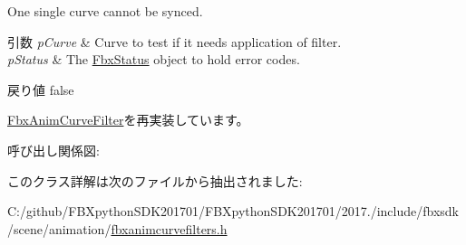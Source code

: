 One single curve cannot be sync\textquotesingle{}ed. 
\begin{DoxyParams}{引数}
{\em p\+Curve} & Curve to test if it needs application of filter. \\
\hline
{\em p\+Status} & The \hyperlink{class_fbx_status}{Fbx\+Status} object to hold error codes. \\
\hline
\end{DoxyParams}
\begin{DoxyReturn}{戻り値}
{\ttfamily false} 
\end{DoxyReturn}


\hyperlink{class_fbx_anim_curve_filter_af768a9c47e4f5a5fff47a8ec781e6b4c}{Fbx\+Anim\+Curve\+Filter}を再実装しています。

呼び出し関係図\+:


このクラス詳解は次のファイルから抽出されました\+:\begin{DoxyCompactItemize}
\item 
C\+:/github/\+F\+B\+Xpython\+S\+D\+K201701/\+F\+B\+Xpython\+S\+D\+K201701/2017./include/fbxsdk/scene/animation/\hyperlink{fbxanimcurvefilters_8h}{fbxanimcurvefilters.\+h}\end{DoxyCompactItemize}
